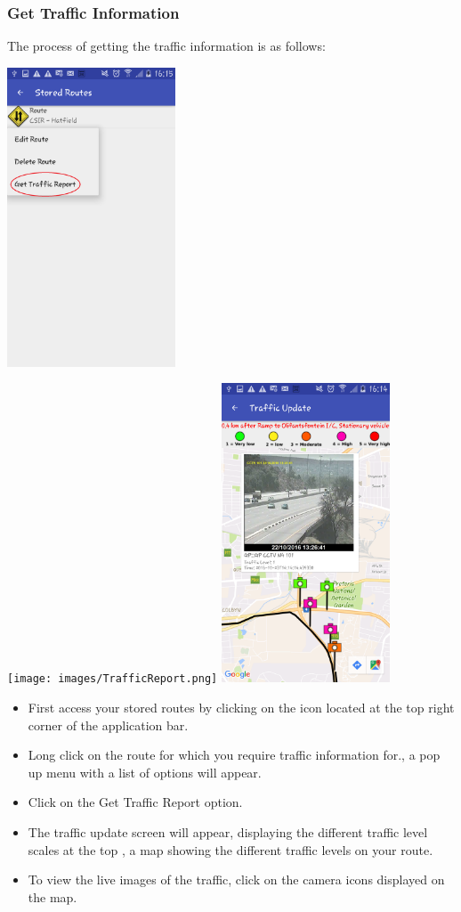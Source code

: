 \documentclass[a4paper,12pt]{article}
\begin{document}
\subsubsection{Get Traffic Information}
The process of getting the traffic information is as follows:
\begin{center}
\includegraphics[width=50mm, scale=0.5]{images/TrafficReportOption.png}
\end{center}
\begin{center}
\texttt{[image: images/TrafficReport.png]}
\includegraphics[width=50mm, scale=0.5]{images/TrafficReport4.png}
\end{center}
\begin{itemize}
    \item First access your stored routes by  clicking on the icon located at the top right corner of the application bar. 
    \item Long click on the route for which you require traffic information for., a pop up menu with a list of options will appear.
    \item Click on the Get Traffic Report option.
    \item The traffic update screen will appear, displaying the different traffic level scales at the top , a map showing the different   traffic levels on your route. 
    \item To view the live images of the traffic, click on the camera icons displayed on the map.
\end{itemize}
\end{document}
